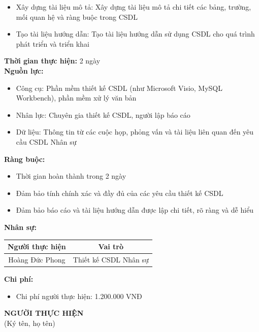 {\begin{minipage}{\textwidth}
\begin{itemize}
        \item Xây dựng tài liệu mô tả: Xây dựng tài liệu mô tả chi tiết các bảng, trường, mối quan hệ và ràng buộc trong CSDL
        \item Tạo tài liệu hướng dẫn: Tạo tài liệu hướng dẫn sử dụng CSDL cho quá trình phát triển và triển khai
    \end{itemize}
    \vspace{0.5cm}
    \noindent \textbf{Thời gian thực hiện:} 2 ngày \\
    \noindent \textbf{Nguồn lực:}
    \begin{itemize}
        \item Công cụ: Phần mềm thiết kế CSDL (như Microsoft Visio, MySQL Workbench), phần mềm xử lý văn bản
        \item Nhân lực: Chuyên gia thiết kế CSDL, người lập báo cáo
        \item Dữ liệu: Thông tin từ các cuộc họp, phỏng vấn và tài liệu liên quan đến yêu cầu CSDL Nhân sự
    \end{itemize}
    \vspace{0.5cm}
    \noindent \textbf{Ràng buộc:}
    \begin{itemize}
        \item Thời gian hoàn thành trong 2 ngày
        \item Đảm bảo tính chính xác và đầy đủ của các yêu cầu thiết kế CSDL
        \item Đảm bảo báo cáo và tài liệu hướng dẫn được lập chi tiết, rõ ràng và dễ hiểu
    \end{itemize}
    \vspace{0.5cm}
    \noindent \textbf{Nhân sự:}
    \begin{longtable}{|c|c|}
    \hline
    \textbf{Người thực hiện} & \textbf{Vai trò} \\
    \hline
    Hoàng Đức Phong & Thiết kế CSDL Nhân sự \\
    \hline
    \end{longtable}
    \vspace{0.5cm}
    \noindent \textbf{Chi phí:}
    \begin{itemize}
        \item Chi phí người thực hiện: 1.200.000 VNĐ
    \end{itemize}
    \vspace{1cm}
    \begin{flushleft}
        \hspace{8cm} \textbf{NGƯỜI THỰC HIỆN} \\
        \hspace{8.8cm} (Ký tên, họ tên) \\
        \vspace{1cm}
    \end{flushleft}
    \end{minipage}
}
% 

